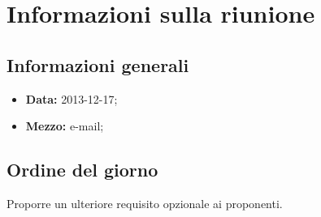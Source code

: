 \section{Informazioni sulla riunione}
\label{inforiunione}
\subsection{Informazioni generali}
\label{infogenerali}
\begin{itemize}
\item\textbf{Data:} 2013-12-17;
\item\textbf{Mezzo:} e-mail;
\end{itemize}

\subsection{Ordine del giorno}
\label{odg}
Proporre un ulteriore requisito opzionale ai proponenti.